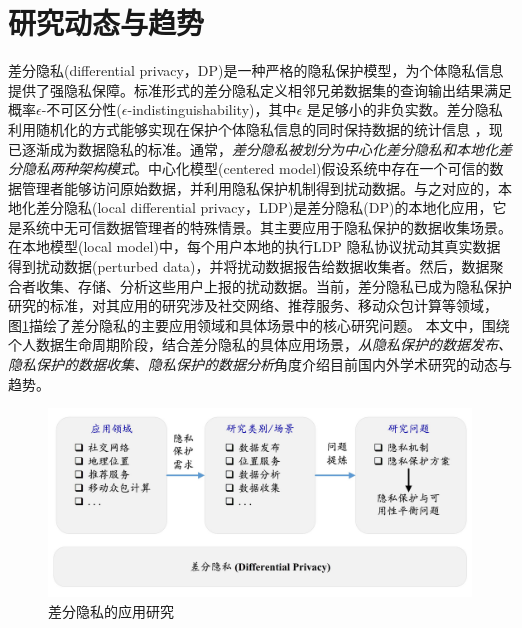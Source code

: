 \section{研究动态与趋势}
差分隐私(differential privacy，DP)是一种严格的隐私保护模型，为个体隐私信息提供了强隐私保障。标准形式的差分隐私\cite{dwork2006differential,dwork2006calibrating}定义相邻兄弟数据集的查询输出结果满足概率$\epsilon$-不可区分性($\epsilon$-indistinguishability)，其中$\epsilon$ 是足够小的非负实数。差分隐私利用随机化的方式能够实现在保护个体隐私信息的同时保持数据的统计信息
\cite{dwork2006differential,dwork2006calibrating,dwork2008differential}，现已逐渐成为数据隐私的标准。通常，{\em 差分隐私被划分为中心化差分隐私和本地化差分隐私两种架构模式}\cite{dwork2014algorithmic}。中心化模型(centered model)假设系统中存在一个可信的数据管理者能够访问原始数据，并利用隐私保护机制得到扰动数据。与之对应的，本地化差分隐私(local differential privacy，LDP)\cite{kasiviswanathan2011what,duchi2013local}是差分隐私(DP)的本地化应用，它是系统中无可信数据管理者的特殊情景。其主要应用于隐私保护的数据收集场景。在本地模型(local model)中，每个用户本地的执行LDP 隐私协议扰动其真实数据得到扰动数据(perturbed data)，并将扰动数据报告给数据收集者。然后，数据聚合者收集、存储、分析这些用户上报的扰动数据。当前，差分隐私已成为隐私保护研究的标准，对其应用的研究涉及社交网络\cite{wei2020asgldp,kasiviswanathan2013analyzing}、推荐服务\cite{xiao2020deep}、移动众包计算\cite{sei2017differential}等领域，%
图\ref{fig:chapter02-application-research}描绘了差分隐私的主要应用领域和具体场景中的核心研究问题。
本文中，围绕个人数据生命周期阶段，结合差分隐私的具体应用场景，{\em 从隐私保护的数据发布、隐私保护的数据收集、隐私保护的数据分析}角度介绍目前国内外学术研究的动态与趋势。%

\begin{figure}[htbp]
	\centering
	\includegraphics[width = 0.85\linewidth]{./figures/chapter02_3.jpg}
	\caption{差分隐私的应用研究}
	\label{fig:chapter02-application-research}
\end{figure}

